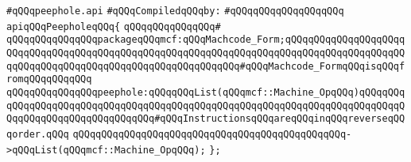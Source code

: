 \label{src/lib/compiler/back/low/code/peephole.api}
\verb|#qQQqpeephole.api|\newline
\newline
\verb|#qQQqCompiledqQQqby:|\newline
\verb|#qQQqqQQqqQQqqQQqqQQq|\newline
\newline
\verb|apiqQQqPeepholeqQQq{|\newline
\verb|qQQqqQQqqQQqqQQq#|\newline
\verb|qQQqqQQqqQQqqQQqpackageqQQqmcf:qQQqMachcode_Form;qQQqqQQqqQQqqQQqqQQqqQQqqQQqqQQqqQQqqQQqqQQqqQQqqQQqqQQqqQQqqQQqqQQqqQQqqQQqqQQqqQQqqQQqqQQqqQQqqQQqqQQqqQQqqQQqqQQqqQQqqQQqqQQqqQQq#qQQqMachcode_FormqQQqisqQQqfromqQQqqQQqqQQq|\newline
\newline
\verb|qQQqqQQqqQQqqQQqpeephole:qQQqqQQqList(qQQqmcf::Machine_OpqQQq)qQQqqQQqqQQqqQQqqQQqqQQqqQQqqQQqqQQqqQQqqQQqqQQqqQQqqQQqqQQqqQQqqQQqqQQqqQQqqQQqqQQqqQQqqQQqqQQqqQQqqQQq#qQQqInstructionsqQQqareqQQqinqQQqreverseqQQqorder.qQQq|\newline
\verb|qQQqqQQqqQQqqQQqqQQqqQQqqQQqqQQqqQQqqQQqqQQqqQQq->qQQqList(qQQqmcf::Machine_OpqQQq);|\newline
\verb|};|\newline

